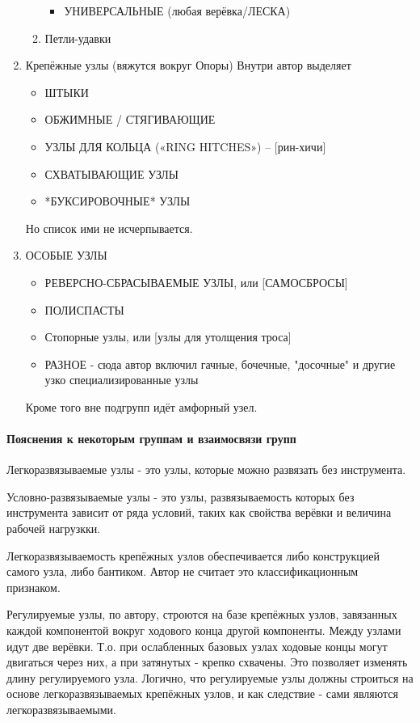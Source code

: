 \begin{enumerate}
\begin{enumerate}
\begin{itemize}
\item УНИВЕРСАЛЬНЫЕ (любая верёвка/ЛЕСКА)
\end{itemize}
\item Петли-удавки
\end{enumerate}
\item Крепёжные узлы (вяжутся вокруг Опоры)
Внутри автор выделяет
\begin{itemize}
\item ШТЫКИ
\item ОБЖИМНЫЕ / СТЯГИВАЮЩИЕ
\item УЗЛЫ ДЛЯ КОЛЬЦА («RING HITCHES») – [рин-хичи]
\item СХВАТЫВАЮЩИЕ УЗЛЫ
\item *БУКСИРОВОЧНЫЕ* УЗЛЫ
\end{itemize}
Но список ими не исчерпывается.
\item ОСОБЫЕ УЗЛЫ
\begin{itemize}
\item РЕВЕРСНО-СБРАСЫВАЕМЫЕ УЗЛЫ, или [САМОСБРОСЫ]
\item ПОЛИСПАСТЫ
\item Стопорные узлы, или [узлы для утолщения троса]
\item РАЗНОЕ - сюда автор включил гачные, бочечные, "досочные" и другие узко специализированные узлы
\end{itemize}
Кроме того вне подгрупп идёт амфорный узел.
\end{enumerate}

\paragraph{Пояснения к некоторым группам и взаимосвязи групп}
Легкоразвязываемые узлы - это узлы, которые можно развязать без инструмента.

Условно-развязываемые узлы - это узлы, развязываемость которых без инструмента зависит от ряда условий, таких как свойства верёвки и величина рабочей нагрузкки.

Легкоразвязываемость крепёжных узлов обеспечивается либо конструкцией самого узла, либо бантиком. Автор не считает это классификационным признаком.

Регулируемые узлы, по автору, строются на базе крепёжных узлов, завязанных каждой компонентой вокруг ходового конца другой компоненты. Между узлами идут две верёвки. Т.о. при ослабленных базовых узлах ходовые концы могут двигаться через них, а при затянутых - крепко схвачены. Это позволяет изменять длину регулируемого узла. Логично, что регулируемые узлы должны строиться на основе легкоразвязываемых крепёжных узлов, и как следствие - сами являются легкоразвязываемыми.

